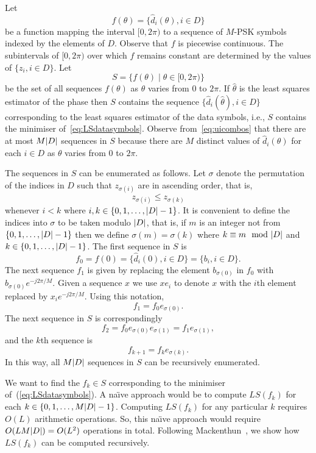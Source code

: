 \documentclass[journal]{IEEEtran}
\begin{document}
Let 
\[
f(\theta) = \{ \hat{d}_i(\theta), i \in D \}
\]
be a function mapping the interval $[0, 2\pi)$ to a sequence of $M$-PSK symbols indexed by the elements of $D$.  Observe that $f$ is piecewise continuous.  The subintervals of $[0, 2\pi)$ over which $f$ remains constant are determined by the values of $\{z_i, i \in D\}$.  Let
\[
S = \{ f(\theta) \mid \theta \in [0, 2 \pi) \}
\]
be the set of all sequences $f(\theta)$ as $\theta$ varies from $0$ to $2\pi$.  If $\hat{\theta}$ is the least squares estimator of the phase then $S$ contains the sequence $\{ \hat{d}_i(\hat{\theta}), i \in D \}$ corresponding to the least squares estimator of the data symbols, i.e., $S$ contains the minimiser of~\eqref{eq:LSdatasymbols}.  Observe from~\eqref{eq:uicombos} that there are at most $M{\left\vert D \right\vert}$ sequences in $S$ because there are $M$ distinct values of $\hat{d}_i(\theta)$ for each $i \in D$ as $\theta$ varies from $0$ to $2\pi$.

The sequences in $S$ can be enumerated as follows.  Let $\sigma$ denote the permutation of the indices in $D$ such that $z_{\sigma(i)}$ are in ascending order, that is,
\begin{equation}\label{eq:sigmasortind}
z_{\sigma(i)} \leq z_{\sigma(k)}
\end{equation}
whenever $i < k $ where $i, k \in \{0, 1, \dots, {\left\vert D \right\vert}-1\}$.  It is convenient to define the indices into $\sigma$ to be taken modulo ${\left\vert D \right\vert}$, that is, if $m$ is an integer not from $\{0, 1, \dots, {\left\vert D \right\vert}-1\}$ then we define $\sigma(m) = \sigma(k)$ where $k \equiv m \mod \abs{D}$ and $k \in  \{0, 1, \dots, {\left\vert D \right\vert}-1\}$.  The first sequence in $S$ is 
\[
f_0 = f(0) = \{ \hat{d}_i(0), i \in D \} = \{ b_i, i \in D \}.
\]  
The next sequence $f_1$ is given by replacing the element $b_{\sigma(0)}$ in $f_0$ with $b_{\sigma(0)}e^{-j2\pi/M}$.  Given a sequence $x$ we use $x e_i$ to denote $x$ with the $i$th element replaced by $x_i e^{-j2\pi/M}$.  Using this notation,  
\[
f_1 = f_0 e_{\sigma(0)}.
\] 
The next sequence in $S$ is correspondingly 
\[
f_2 = f_0 e_{\sigma(0)} e_{\sigma(1)} = f_1 e_{\sigma(1)},
\]
and the $k$th sequence is
\begin{equation}\label{eq:fkrec}
f_{k+1} = f_{k} e_{\sigma(k)}.
\end{equation}
In this way, all $M{\left\vert D \right\vert}$ sequences in $S$ can be recursively enumerated.

We want to find the $f_k \in S$ corresponding to the minimiser of~(\ref{eq:LSdatasymbols}).  A na\"{\i}ve approach would be to compute $LS(f_k)$ for each $k \in \{0,1,\dots,M{\left\vert D \right\vert}-1\}$.  Computing $LS(f_k)$ for any particular $k$ requires $O(L)$ arithmetic operations.  So, this na\"{\i}ve approach would require $O(L M {\left\vert D \right\vert}) = O(L^2)$ operations in total.  Following Mackenthun~\cite{Mackenthun1994}, we show how $LS(f_k)$ can be computed recursively.
\end{document}
